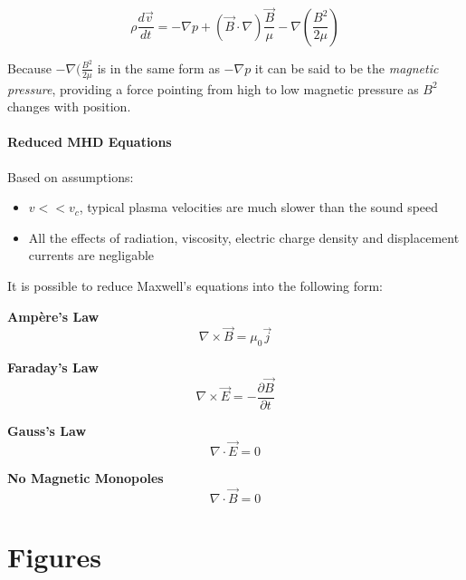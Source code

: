 \begin{equation}\label{maghydstat}
\rho\frac{d\vec{v}}{dt}= -\nabla p + (\vec{B}\cdot\nabla)\frac{\vec{B}}{\mu}-\nabla(\frac{B^2}{2\mu}) 
\end{equation}

Because $-\nabla(\frac{B^2}{2\mu}$ is in the same form as $-\nabla p$ it can be said to be the \emph{magnetic pressure}, providing a force pointing from high to low magnetic pressure as $B^2$ changes with position.

\paragraph{Reduced MHD Equations}
Based on assumptions:
\begin{itemize}
\item $v<<v_{c}$, typical plasma velocities are much slower than the sound speed 
\item All the effects of radiation, viscosity, electric charge density and displacement currents are negligable 
\end{itemize}
It is possible to reduce Maxwell's equations into the following form:

\textbf{Ampère's Law}
\begin{equation}\label{max1:ampere}
\nabla\times\vec{B}=\mu_{0}\vec{j}
\end{equation}

\textbf{Faraday's Law}
\begin{equation}\label{max2:faraday}
\nabla\times\vec{E}=-\frac{\partial \vec{B}}{\partial t}
\end{equation}

\textbf{Gauss's Law}
\begin{equation}\label{max3:gauss}
\nabla\cdot\vec{E}=0
\end{equation}

\textbf{No Magnetic Monopoles}
\begin{equation}\label{max4:nomonopole}
\nabla\cdot\vec{B}=0
\end{equation}

\section{Figures}\label{figures}

